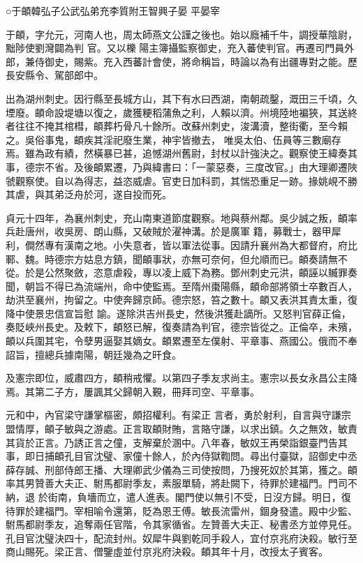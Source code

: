 
\begin{pinyinscope}

 ○于頔韓弘子公武弘弟充李質附王智興子晏
 平晏宰



 于頔，字允元，河南人也，周太師燕文公謹之後也。始以廕補千牛，調授華陰尉，黜陟使劉灣闢為判
 官。又以櫟
 陽主簿攝監察御史，充入蕃使判官。再遷司門員外郎，兼侍御史，賜紫。充入西蕃計會使，將命稱旨，時論以為有出疆專對之能。歷長安縣令、駕部郎中。



 出為湖州刺史。因行縣至長城方山，其下有水曰西湖，南朝疏鑿，溉田三千頃，久堙廢。頔命設堤塘以復之，歲獲粳稻蒲魚之利，人賴以濟。州境陸地褊狹，其送終者往往不掩其棺槥，頔葬朽骨凡十餘所。改蘇州刺史，浚溝瀆，整街衢，至今賴之。吳俗事鬼，頔疾其淫祀廢生業，神宇皆撤去，
 唯吳太伯、伍員等三數廟存焉。雖為政有績，然橫暴已甚，追憾湖州舊尉，封杖以計強決之。觀察使王緯奏其事，德宗不省。及後頔累遷，乃與緯書曰：「一蒙惡奏，三度改官。」由大理卿遷陜虢觀察使。自以為得志，益恣威虐。官吏日加科罰，其惴恐重足一跡。掾姚峴不勝其虐，與其弟泛舟於河，遂自投而死。



 貞元十四年，為襄州刺史，充山南東道節度觀察。地與蔡州鄰。吳少誠之叛，頔率兵赴唐州，收吳房、朗山縣，又破賊於濯神溝。於是廣軍
 籍，募戰士，器甲犀利，僴然專有漢南之地。小失意者，皆以軍法從事。因請升襄州為大都督府，府比鄆、魏。時德宗方姑息方鎮，聞頔事狀，亦無可奈何，但允順而已。頔奏請無不從。於是公然聚斂，恣意虐殺，專以凌上威下為務。鄧州刺史元洪，頔誣以贓罪奏聞，朝旨不得已為流端州，命中使監焉。至隋州棗陽縣，頔命部將領士卒數百人，劫洪至襄州，拘留之。中使奔歸京師。德宗怒，笞之數十。頔又表洪其責太重，復降中使景忠信宣旨慰
 諭。遂除洪吉州長史，然後洪獲赴謫所。又怒判官薛正倫，奏貶峽州長史。及敕下，頔怒已解，復奏請為判官，德宗皆從之。正倫卒，未殯，頔以兵圍其宅，令孽男逼娶其嫡女。頔累遷至左僕射、平章事、燕國公。俄而不奉詔旨，擅總兵據南陽，朝廷幾為之旰食。



 及憲宗即位，威肅四方，頔稍戒懼。以第四子季友求尚主。憲宗以長女永昌公主降焉。其第二子方，屢諷其父歸朝入覲，冊拜司空、平章事。



 元和中，內官梁守謙掌樞密，頗招權利。有梁正
 言者，勇於射利，自言與守謙宗盟情厚，頔子敏與之游處。正言取頔財賄，言賂守謙，以求出鎮。久之無效，敏責其貨於正言。乃誘正言之僮，支解棄於溷中。八年春，敏奴王再榮詣銀臺門告其事，即日捕頔孔目官沈璧、家僮十餘人，於內侍獄鞫問。尋出付臺獄，詔御史中丞薛存誠、刑部侍郎王播、大理卿武少儀為三司使按問，乃搜死奴於其第，獲之。頔率其男贊善大夫正、駙馬都尉季友，素服單騎，將赴闕下，待罪於建福門。門司不納，退
 於街南，負墻而立，遣人進表。閣門使以無引不受，日沒方歸。明日，復待罪於建福門。宰相喻令還第，貶為恩王傅。敏長流雷州，錮身發遣。殿中少監、駙馬都尉季友，追奪兩任官階，令其家循省。左贊善大夫正、秘書丞方並停見任。孔目官沈璧決四十，配流封州。奴犀牛與劉乾同手殺人，宜付京兆府決殺。敏行至商山賜死。梁正言、僧鑒虛並付京兆府決殺。頔其年十月，改授太子賓客。




\end{pinyinscope}
